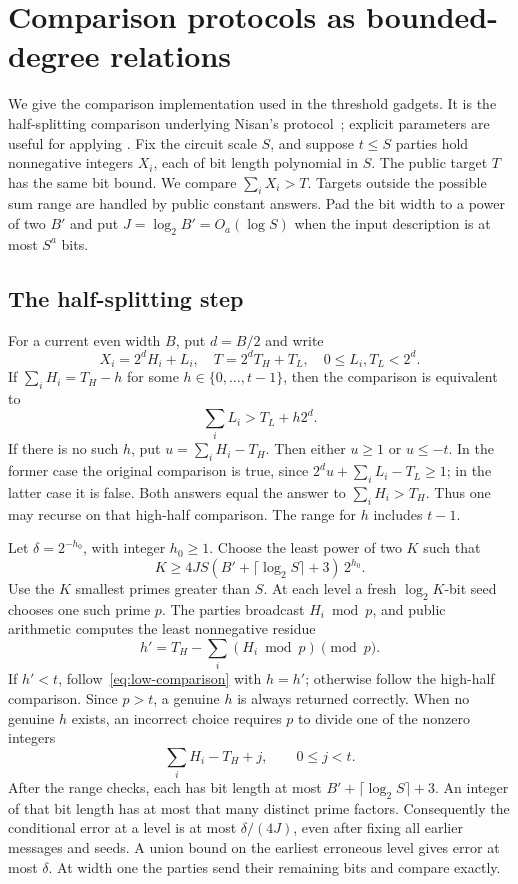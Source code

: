 \section{Comparison protocols as bounded-degree relations}
\label{sec:protocol}

We give the comparison implementation used in the threshold gadgets.
It is the half-splitting comparison underlying Nisan's
protocol~\cite{Nisan93}; explicit parameters are useful for applying
\HTC. Fix the circuit scale $S$, and suppose $t\le S$ parties hold
nonnegative integers $X_i$, each of bit length polynomial in $S$.
The public target $T$ has the same bit bound. We compare
$\sum_iX_i>T$. Targets outside the possible sum range are handled by
public constant answers. Pad the bit width to a power of two $B'$ and
put $J=\log_2 B'=O_a(\log S)$ when the input description is at most
$S^a$ bits.

\subsection{The half-splitting step}

For a current even width $B$, put $d=B/2$ and write
\[
 X_i=2^dH_i+L_i,\quad T=2^dT_H+T_L,
 \quad 0\le L_i,T_L<2^d.
\]
If $\sum_iH_i=T_H-h$ for some $h\in\{0,\ldots,t-1\}$, then the
comparison is equivalent to
\begin{equation}\label{eq:low-comparison}
 \sum_i L_i>T_L+h2^d.
\end{equation}
If there is no such $h$, put $u=\sum_iH_i-T_H$. Then either $u\ge1$
or $u\le-t$. In the former case the original comparison is true, since
$2^du+\sum_iL_i-T_L\ge1$; in the latter case it is false. Both
answers equal the answer to $\sum_iH_i>T_H$. Thus one may recurse on
that high-half comparison. The range for $h$ includes $t-1$.

Let $\delta=2^{-h_0}$, with integer $h_0\ge1$. Choose the least power
of two $K$ such that
\begin{equation}\label{eq:prime-family}
 K\ge 4JS(B'+\lceil\log_2S\rceil+3)\,2^{h_0}.
\end{equation}
Use the $K$ smallest primes greater than $S$. At each level a fresh
$\log_2K$-bit seed chooses one such prime $p$. The parties broadcast
$H_i\bmod p$, and public arithmetic computes the least nonnegative
residue
\[
 h'=T_H-\sum_i(H_i\bmod p)\pmod p.
\]
If $h'<t$, follow~\eqref{eq:low-comparison} with $h=h'$; otherwise
follow the high-half comparison. Since $p>t$, a genuine $h$ is always
returned correctly. When no genuine $h$ exists, an incorrect choice
requires $p$ to divide one of the nonzero integers
\[
 \sum_iH_i-T_H+j,\qquad 0\le j<t.
\]
After the range checks, each has bit length at most
$B'+\lceil\log_2S\rceil+3$. An integer of that bit length has at most
that many distinct prime factors. Consequently the conditional error
at a level is at most $\delta/(4J)$, even after fixing all earlier
messages and seeds. A union bound on the earliest erroneous level gives
error at most $\delta$. At width one the parties send their remaining
bits and compare exactly.

